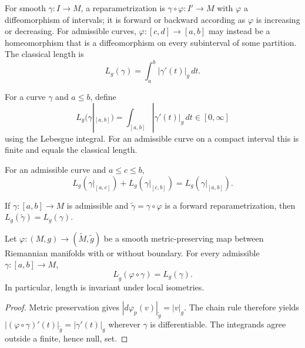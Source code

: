 For smooth $\gamma:I\to M$, a reparametrization is $\gamma\circ\varphi:I'\to M$ with $\varphi$ a diffeomorphism of intervals; it is forward or backward according as $\varphi$ is increasing or decreasing. For admissible curves, $\varphi:[c,d]\to[a,b]$ may instead be a homeomorphism that is a diffeomorphism on every subinterval of some partition. The classical length is
\[
L_g(\gamma)=\int_a^b|\gamma'(t)|_g\,dt.
\]

\begin{definition}
\label{def:length-of-curve}
\mathlibok
{}
For a curve $\gamma$ and $a\le b$, define
\[
L_g(\gamma|_{[a,b]})=\int_{[a,b]}|\gamma'(t)|_g\,dt\in[0,\infty]
\]
using the Lebesgue integral. For an admissible curve on a compact interval this is finite and equals the classical length.
\end{definition}

\begin{proposition}
\label{prop:length-additive}
\mathlibok
{}
For an admissible curve and $a\le c\le b$,
\[
L_g(\gamma|_{[a,c]})+L_g(\gamma|_{[c,b]})=L_g(\gamma|_{[a,b]}).
\]
\end{proposition}

\begin{proposition}
\label{prop:length-reparam-invariant}
\mathlibok
{}
If $\gamma:[a,b]\to M$ is admissible and $\widetilde\gamma=\gamma\circ\varphi$ is a forward reparametrization, then $L_g(\widetilde\gamma)=L_g(\gamma)$.
\end{proposition}

\begin{proposition}
\label{prop:length-isometry-invariant}
\leanok
{}
Let $\varphi:(M,g)\to(\widetilde M,\widetilde g)$ be a smooth metric-preserving map between Riemannian manifolds with or without boundary. For every admissible $\gamma:[a,b]\to M$,
\[
L_{\widetilde g}(\varphi\circ\gamma)=L_g(\gamma).
\]
In particular, length is invariant under local isometries.
\end{proposition}
\begin{proof}
\leanok
{}
\sketch Metric preservation gives $|d\varphi_p(v)|_{\widetilde g}=|v|_g$. The chain rule therefore yields $|(\varphi\circ\gamma)'(t)|_{\widetilde g}=|\gamma'(t)|_g$ wherever $\gamma$ is differentiable. The integrands agree outside a finite, hence null, set.
\end{proof}

